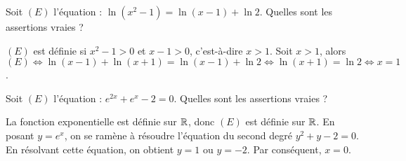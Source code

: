 \begin{question} 
Soit $(E)$ l'équation : $\ln (x^2-1) = \ln (x-1) + \ln 2$. Quelles sont les assertions vraies ?
\begin{answers}
    \bad{$(E)$ est définie sur  $]-\infty, -1[ \cup  ]1,+\infty[$.}

    \good{$(E)$ est définie sur  $]1,+\infty[$.}


\end{answers}
\begin{explanations}
$(E)$ est définie si $x^2-1>0$ et $x-1>0$, c'est-à-dire $x>1$. 
Soit $x>1$, alors $(E) \Leftrightarrow  \ln (x-1) + \ln (x+1)= \ln (x-1) + \ln 2  \Leftrightarrow  \ln (x+1)=  \ln 2 \Leftrightarrow  x=1$.
\end{explanations}

\end{question}


\begin{question} 
Soit $(E)$ l'équation : $e^{2x}+e^x-2=0$. Quelles sont les assertions vraies ?

\begin{answers}



\end{answers}
\begin{explanations}
La fonction exponentielle est définie sur $\mathbb{R}$, donc $(E)$ est définie sur $\mathbb{R}$. 
En posant $y=e^x$, on se ramène à résoudre l'équation du second degré $y^2+y-2=0$. En résolvant cette équation, on obtient $y=1$ ou $y=-2$. Par conséquent, $x=0$.
\end{explanations}


\end{question}

